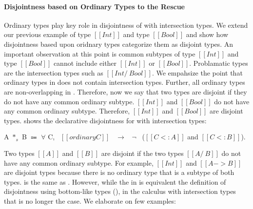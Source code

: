 \paragraph{Disjointness based on Ordinary Types to the Rescue}
Ordinary types play key role in disjointness of \cal with intersection types.
We extend our previous example of type $[[Int]]$ and type $[[Bool]]$ and show how
disjointness based upon oridnary types categorize them as disjoint types.
An important observation at this point is common subtypes of type $[[Int]]$ and type $[[Bool]]$
cannot include either $[[Int]]$ or $[[Bool]]$. Problamatic types are the intersection types
such as $[[Int /\ Bool]]$. We empahsize the point that ordinary types in \cal does not contain
intersection types. Further, all ordinary types are non-overlapping in \cal.
Therefore, now we say that
two types are disjoint if they do not have any common ordinary subtype. $[[Int]]$ and $[[Bool]]$
do not have any common ordinary subtype. Therefore, $[[Int]]$ and $[[Bool]]$ are disjoint types.
 shows the declarative disjointness for \cal with intersection types:

\begin{definition}
\label{def:inter:disj}
  A $*_s$ B $\Coloneqq$ $\forall$ C, \ $[[ordinary C]]$ \ $\rightarrow$ \ $\neg$ \ ($[[C <: A]]$ and $[[C <: B]]$).
\end{definition}

\noindent Two types $[[A]]$ and $[[B]]$ are
disjoint if the two types $[[A /\ B]]$ do
not have any common ordinary subtype. For example, $[[Int]]$ and $[[A -> B]]$
are disjoint types because there is no ordinary type that is a subtype
of both types.   is the same as 
. However, while the  in 
is equivalent the definition of disjointness using bottom-like types (),
in the calculus with intersection types that is no longer the case. We elaborate 
 on few examples:

